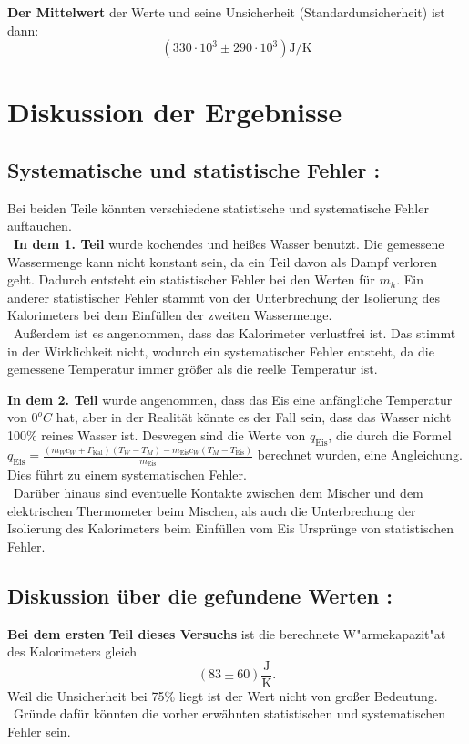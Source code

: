 \documentclass[11pt,a4paper]{article} %
\begin{document}
\textbf{Der Mittelwert} der Werte und seine Unsicherheit (Standardunsicherheit) ist dann:
$$(330\cdot10^{3} \pm 290\cdot10^{3}) \textrm{J/K}$$

\section{Diskussion der Ergebnisse}
\subsection{Systematische und statistische Fehler :}

Bei beiden Teile k\"onnten verschiedene statistische und
systematische Fehler auftauchen.
\\\
\textbf{In dem 1. Teil} wurde kochendes und heißes Wasser benutzt.
Die gemessene Wassermenge kann nicht konstant sein, da ein Teil davon als Dampf verloren geht. Dadurch entsteht ein statistischer Fehler bei den Werten für $m_h$.
Ein anderer statistischer Fehler stammt von der Unterbrechung der Isolierung des Kalorimeters bei dem Einfüllen der zweiten Wassermenge.
\\\
Außerdem ist es angenommen, dass das Kalorimeter verlustfrei ist. Das stimmt in der Wirklichkeit nicht, wodurch ein systematischer Fehler entsteht, da die gemessene Temperatur immer größer als die reelle Temperatur ist. 

\textbf{In dem 2. Teil} wurde angenommen, dass das Eis eine anfängliche Temperatur von $0^oC$ hat, aber in der Realit\"at könnte es der Fall sein, dass das Wasser nicht 100\% reines Wasser ist. Deswegen sind die Werte von $q_\textrm{Eis}$, die durch die Formel
$q_\textrm{Eis} = \frac{(m_W c_W + \Gamma_\textrm{Kal})(T_W - T_M) - m_\textrm{Eis} c_W(T_M - T_\textrm{Eis})}{m_\textrm{Eis}}$ berechnet wurden, eine Angleichung. Dies f\"uhrt zu einem systematischen Fehler.
\\\
Darüber hinaus sind eventuelle Kontakte zwischen dem Mischer und dem elektrischen Thermometer beim Mischen, als auch die Unterbrechung der Isolierung des Kalorimeters beim Einf\"ullen vom Eis Ursprünge von statistischen Fehler.

\subsection{Diskussion \"uber die gefundene Werten :}

\textbf{Bei dem ersten Teil dieses Versuchs} ist  die berechnete W"armekapazit"at des Kalorimeters gleich $$(83 \pm 60 ) \mathrm{\frac{J}{K}}.$$
Weil die Unsicherheit bei 75\% liegt ist der Wert nicht
von großer Bedeutung.
\\\
Gründe daf\"ur k\"onnten die vorher erwähnten statistischen und systematischen Fehler sein.
\end{document}
